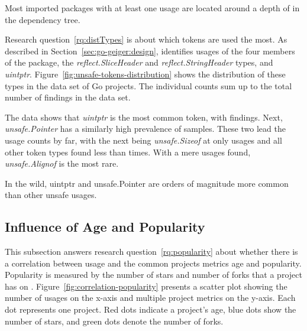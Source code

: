 \begin{tcolorbox}[boxsep=3pt, enlarge top by=5pt, title=Answer to~\ref{rq:depsDepth}]
    Most imported packages with at least one \unsafe{} usage are located around a depth of
    \averageUnsafeImportDepthRounded{} in the dependency tree.
\end{tcolorbox}

Research question~\ref{rq:distTypes} is about which \unsafe{} tokens are used the most.
As described in Section~\ref{sec:go-geiger:design}, \toolGeiger{} identifies usages of the four members of the \unsafe{}
package, the \textit{reflect.SliceHeader} and \textit{reflect.StringHeader} types, and \textit{uintptr}.
Figure~\ref{fig:unsafe-tokens-distribution} shows the distribution of these \unsafe{} types in the data set of Go
projects.
The individual counts sum up to the total number of \uniqueUnsafeFindings{} \unsafe{} findings in the data set.



The data shows that \textit{uintptr} is the most common \unsafe{} token, with  findings.
Next, \textit{unsafe.Pointer} has a similarly high prevalence of  samples.
These two lead the usage counts by far, with the next being \textit{unsafe.Sizeof} at only  usages and
all other token types found less than  times.
With a mere  usages found, \textit{unsafe.Alignof} is the most rare.

\begin{tcolorbox}[boxsep=3pt, enlarge top by=5pt, title=Answer to~\ref{rq:distTypes}]
    In the wild, uintptr and unsafe.Pointer are orders of magnitude more common than other unsafe usages.
\end{tcolorbox}



\subsection{Influence of Age and Popularity}\label{subsec:go-geiger:evaluation:popularity}

This subsection answers research question~\ref{rq:popularity} about whether there is a correlation between \unsafe{}
usage and the common projects metrics age and popularity.
Popularity is measured by the number of stars and number of forks that a project has on \github{}.
Figure~\ref{fig:correlation-popularity} presents a scatter plot showing the number of \unsafe{} usages on the x-axis and
multiple project metrics on the y-axis.
Each dot represents one project.
Red dots indicate a project's age, blue dots show the number of stars, and green dots denote the number of forks.

